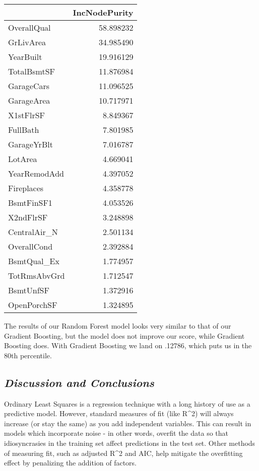 \documentclass[
]{article}
\begin{document}
\begin{longtable}[]{@{}lr@{}}
\toprule
& IncNodePurity \\
\midrule
\endhead
OverallQual & 58.898232 \\
GrLivArea & 34.985490 \\
YearBuilt & 19.916129 \\
TotalBsmtSF & 11.876984 \\
GarageCars & 11.096525 \\
GarageArea & 10.717971 \\
X1stFlrSF & 8.849367 \\
FullBath & 7.801985 \\
GarageYrBlt & 7.016787 \\
LotArea & 4.669041 \\
YearRemodAdd & 4.397052 \\
Fireplaces & 4.358778 \\
BsmtFinSF1 & 4.053526 \\
X2ndFlrSF & 3.248898 \\
CentralAir\_N & 2.501134 \\
OverallCond & 2.392884 \\
BsmtQual\_Ex & 1.774957 \\
TotRmsAbvGrd & 1.712547 \\
BsmtUnfSF & 1.372916 \\
OpenPorchSF & 1.324895 \\
\bottomrule
\end{longtable}

The results of our Random Forest model looks very similar to that of our
Gradient Boosting, but the model does not improve our score, while
Gradient Boosting does. With Gradient Boosting we land on .12786, which
puts us in the 80th percentile.

\hypertarget{discussion-and-conclusions}{%
\subsection{\texorpdfstring{\emph{Discussion and
Conclusions}}{Discussion and Conclusions}}\label{discussion-and-conclusions}}

Ordinary Least Squares is a regression technique with a long history of
use as a predictive model. However, standard measures of fit (like
R\^{}2) will always increase (or stay the same) as you add independent
variables. This can result in models which incorporate noise - in other
words, overfit the data so that idiosyncrasies in the training set
affect predictions in the test set. Other methods of measuring fit, such
as adjusted R\^{}2 and AIC, help mitigate the overfitting effect by
penalizing the addition of factors.
\end{document}
